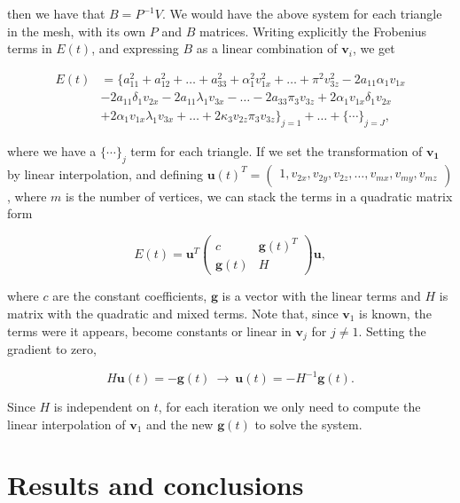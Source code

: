 \documentclass[12pt]{article}
\begin{document}
then we have that $B = P^{-1}V$.
We would have the above system for each triangle in the mesh, with its own $P$ and $B$ matrices.  
Writing explicitly the Frobenius terms in $E(t)$, and expressing $B$ as a linear combination of $\mathbf{v}_i$, we get

\begin{align*}
E(t) &= \lbrace a_{11}^2 + a_{12}^2 + \ldots + a_{33}^2 + \alpha_1^2 v_{1x}^2 + \ldots + \pi^2 v_{3z}^2 - 2 a_{11} \alpha_1 v_{1x} \\
& - 2 a_{11} \delta_1 v_{2x} - 2 a_{11} \lambda_1 v_{3x} - \ldots - 2 a_{33} \pi_3 v_{3z} + 2 \alpha_1 v_{1x} \delta_1 v_{2x} \\ 
& + 2 \alpha_1 v_{1x} \lambda_1 v_{3x} + \ldots + 2 \kappa_3 v_{2z} \pi_3 v_{3z} \rbrace_{j = 1} + \ldots + \lbrace \cdots \rbrace_{j = J},
\end{align*}

where we have a $\lbrace \cdots \rbrace_j$ term for each triangle.
If we set the transformation of $\mathbf{v_1}$ by linear interpolation, and defining 
$\mathbf{u}(t)^T = \begin{pmatrix} 1, v_{2x}, v_{2y}, v_{2z}, \ldots, v_{mx}, v_{my}, v_{mz} \end{pmatrix}$, where $m$ is the number of vertices, we can stack the terms in a quadratic matrix form 

\begin{equation*}
E(t) = \mathbf{u}^T  \begin{pmatrix}
c & \mathbf{g}(t)^T \\
\mathbf{g}(t) & H
\end{pmatrix} \mathbf{u},
\end{equation*}

where $c$ are the constant coefficients, $\mathbf{g}$ is a vector with the linear terms and $H$ is matrix with the quadratic and mixed terms.
Note that, since $\mathbf{v}_1$ is known, the terms were it appears, become constants or linear in $\mathbf{v}_j$ for $j \neq 1$.
Setting the gradient to zero,

\begin{equation*}
H \mathbf{u}(t) = -\mathbf{g}(t) ~ \rightarrow ~ \mathbf{u}(t) = - H ^{-1} \mathbf{g}(t).
\end{equation*}

Since $H$ is independent on $t$, for each iteration we only need to compute the linear interpolation of $\mathbf{v}_1$ and the new $\mathbf{g}(t)$ to solve the system.

\section{Results and conclusions}
\end{document}
